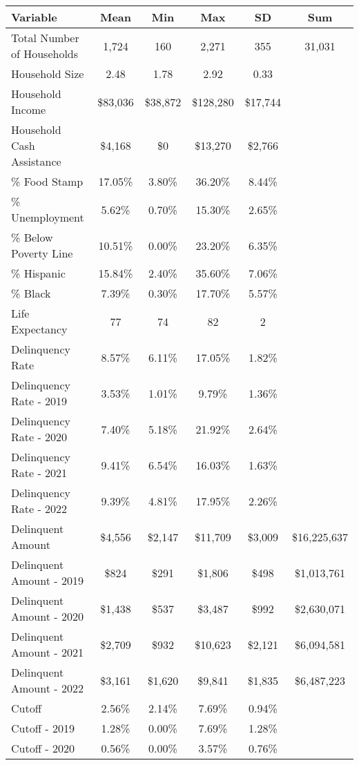 \begin{tabular}{l|c|c|c|c|c}
\toprule 
\midrule 
Variable & Mean & Min & Max & SD & Sum \\
\midrule 
Total Number of Households & 1,724 & 160 & 2,271 & 355 & 31,031 \\
\quad Household Size & 2.48 & 1.78 & 2.92 & 0.33 \\
Household Income & \$83,036 & \$38,872 & \$128,280 & \$17,744 \\
\quad Household Cash Assistance & \$4,168 & \$0 & \$13,270 & \$2,766 \\
\% Food Stamp & 17.05\% & 3.80\% & 36.20\% & 8.44\% \\
\% Unemployment & 5.62\% & 0.70\% & 15.30\% & 2.65\% \\
\% Below Poverty Line & 10.51\% & 0.00\% & 23.20\% & 6.35\% \\
\% Hispanic & 15.84\% & 2.40\% & 35.60\% & 7.06\% \\
\% Black & 7.39\% & 0.30\% & 17.70\% & 5.57\% \\
Life Expectancy & 77 & 74 & 82 & 2 \\
\midrule 
Delinquency Rate & 8.57\% & 6.11\% & 17.05\% & 1.82\% \\
\quad Delinquency Rate - 2019 & 3.53\% & 1.01\% & 9.79\% & 1.36\% \\
\quad Delinquency Rate - 2020 & 7.40\% & 5.18\% & 21.92\% & 2.64\% \\
\quad Delinquency Rate - 2021 & 9.41\% & 6.54\% & 16.03\% & 1.63\% \\
\quad Delinquency Rate - 2022 & 9.39\% & 4.81\% & 17.95\% & 2.26\% \\
\midrule 
Delinquent Amount & \$4,556 & \$2,147 & \$11,709 & \$3,009 & \$16,225,637 \\
\quad Delinquent Amount - 2019 & \$824 & \$291 & \$1,806 & \$498 & \$1,013,761 \\
\quad Delinquent Amount - 2020 & \$1,438 & \$537 & \$3,487 & \$992 & \$2,630,071 \\
\quad Delinquent Amount - 2021 & \$2,709 & \$932 & \$10,623 & \$2,121 & \$6,094,581 \\
\quad Delinquent Amount - 2022 & \$3,161 & \$1,620 & \$9,841 & \$1,835 & \$6,487,223 \\
\midrule 
Cutoff & 2.56\% & 2.14\% & 7.69\% & 0.94\% \\
\quad Cutoff - 2019 & 1.28\% & 0.00\% & 7.69\% & 1.28\% \\
\quad Cutoff - 2020 & 0.56\% & 0.00\% & 3.57\% & 0.76\% \\

\end{tabular}
